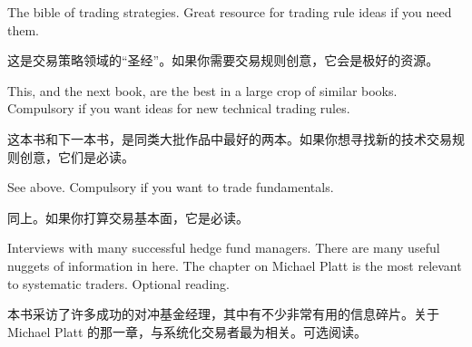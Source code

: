 \begin{englishblock} The bible of trading strategies. Great resource for trading rule ideas if you need them. \end{englishblock}

\begin{chineseblock}这是交易策略领域的“圣经”。如果你需要交易规则创意，它会是极好的资源。\end{chineseblock}


\begin{englishblock} This, and the next book, are the best in a large crop of similar books. Compulsory if you want ideas for new technical trading rules. \end{englishblock}

\begin{chineseblock}这本书和下一本书，是同类大批作品中最好的两本。如果你想寻找新的技术交易规则创意，它们是必读。\end{chineseblock}


\begin{englishblock} See above. Compulsory if you want to trade fundamentals. \end{englishblock}

\begin{chineseblock}同上。如果你打算交易基本面，它是必读。\end{chineseblock}


\begin{englishblock} Interviews with many successful hedge fund managers. There are many useful nuggets of information in here. The chapter on Michael Platt is the most relevant to systematic traders. Optional reading. \end{englishblock}

\begin{chineseblock}本书采访了许多成功的对冲基金经理，其中有不少非常有用的信息碎片。关于 Michael Platt 的那一章，与系统化交易者最为相关。可选阅读。\end{chineseblock}

